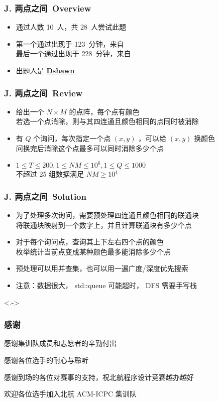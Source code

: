 \documentclass[notheorems]{beamer}
\newcommand{\zhProbJ}{两点之间}		\newcommand{\AuthProbJ}{\textbf{\underline{\href{http://codeforces.com/profile/Phasianus}{Dshawn}}}}
\newcommand{\AccInProbJ}{10}	\newcommand{\SubInProbJ}{28}	\newcommand{\RatInProbJ}{35.71\%}
\newcommand{\FirPenInProbJ}{123}	\newcommand{\FirPerInProbJ}{\NONE}
\newcommand{\LasPenInProbJ}{228}	\newcommand{\LasPerInProbJ}{\NONE}
\begin{document}
\begin{frame}[label = ProbJ]
\frametitle{J. \zhProbJ\ Overview}
\begin{spacing}{2.0} \large
\begin{itemize}[<+->]
\item 通过人数 \AccInProbJ\ 人，共 \SubInProbJ\ 人尝试此题
\item 第一个通过出现于 \FirPenInProbJ\ 分钟，来自 \FirPerInProbJ\ 
\\ 最后一个通过出现于 \LasPenInProbJ\ 分钟，来自 \LasPerInProbJ\ 
\item 出题人是 \AuthProbJ\ 
\end{itemize}
\end{spacing}
\end{frame}
\begin{frame}
\frametitle{J. \zhProbJ\ Review}
\begin{spacing}{2.0} \large
\begin{itemize}[<+->]
\item 给出一个 $N \times M$ 的点阵，每个点有颜色 \\ 若选一个点消除，则与其\alert{四连通且颜色相同}的点同时被消除
\item 有 $Q$ 个询问，每次指定一个点 $(x, y)$ ，可以给 $(x, y)$ 换颜色 \\ 问换完后消除这个点最多可以同时消除多少个点
\item $1 \leq T \leq 200, 1 \leq NM \leq 10^6, 1 \leq Q \leq 1000$ \\ 不超过 25 组数据满足 $NM \geq 10^4$ 
\end{itemize}
\end{spacing}
\end{frame}
\begin{frame}
\frametitle{J. \zhProbJ\ Solution}
\begin{spacing}{2.0} \large
\begin{itemize}[<+->]
\item 为了处理多次询问，需要预处理\alert{四连通且颜色相同}的联通块 \\ 将联通块映射到一个数字上，并且计算联通块有多少个点
\item 对于每个询问点，查询其上下左右四个点的颜色 \\ 枚举统计当前点变成某种颜色最多能消除多少个点
\item 预处理可以用并查集，也可以用一遍广度/深度优先搜索
\item 注意：数据很大， std::queue 可能超时， DFS 需要手写栈
\end{itemize}
\end{spacing}
\visible<.->{\hyperlink{Overview}{}}
\end{frame}

\begin{frame}[label = End]
\frametitle{感谢}
\begin{spacing}{2.0} \large
感谢集训队成员和志愿者的辛勤付出 \pause

感谢各位选手的耐心与聆听 \pause

感谢到场的各位对赛事的支持，祝北航程序设计竞赛越办越好 \pause

欢迎各位选手加入北航 ACM-ICPC 集训队
\end{spacing}
\end{frame}
\end{document}
